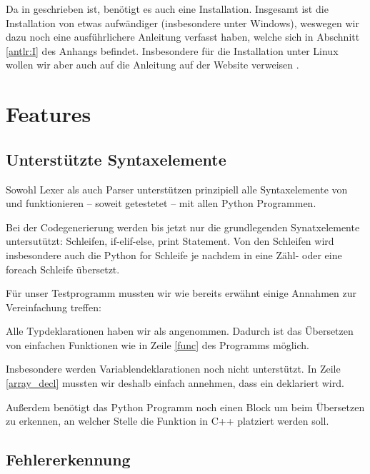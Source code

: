 Da  in  geschrieben ist, benötigt es auch eine  Installation. Insgesamt ist die Installation von  etwas aufwändiger (insbesondere unter Windows), weswegen wir dazu noch eine ausführlichere Anleitung verfasst haben, welche sich in Abschnitt \ref{antlr:I} des Anhangs befindet. Insbesondere für die Installation unter Linux wollen wir aber auch auf die Anleitung auf der  Website verweisen \cite{antlr}.





\section{Features} \label{features}

\subsection{Unterstützte Syntaxelemente}

Sowohl Lexer als auch Parser unterstützen prinzipiell alle Syntaxelemente von  und funktionieren -- soweit getestetet -- mit allen Python Programmen. 

Bei der Codegenerierung werden bis jetzt nur die grundlegenden Synatxelemente untersutützt: Schleifen, if-elif-else, print Statement. Von den Schleifen wird insbesondere auch die Python for Schleife je nachdem in eine Zähl- oder eine foreach Schleife übersetzt.

Für unser Testprogramm mussten wir wie bereits erwähnt einige Annahmen zur Vereinfachung treffen:

Alle Typdeklarationen haben wir als  angenommen. Dadurch ist das Übersetzen von einfachen Funktionen wie in Zeile \ref{func} des Programms möglich.

Insbesondere werden Variablendeklarationen noch nicht unterstützt. In Zeile \ref{array_decl} mussten wir deshalb einfach annehmen, dass ein  deklariert wird.

Außerdem benötigt das Python Programm noch einen  Block um beim Übersetzen zu erkennen, an welcher Stelle die  Funktion in C++ platziert werden soll.

 

\subsection{Fehlererkennung}

